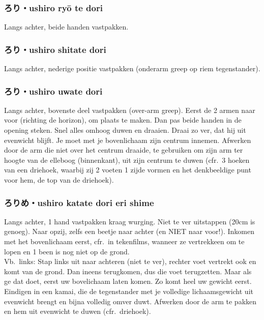 \subsubsection{ろり・ushiro ry\={o} te dori}
Langs achter, beide handen vastpakken.

\subsubsection{ろり・ushiro shitate dori}
Langs achter, nederige positie vastpakken (onderarm greep op riem tegenstander).

\subsubsection{ろり・ushiro uwate dori}
Langs achter, bovenste deel vastpakken (over-arm greep). Eerst de 2 armen naar voor (richting de horizon), om plaats te maken. Dan pas beide handen in de opening steken. Snel alles omhoog duwen en draaien. Draai zo ver, dat hij uit evenwicht blijft. Je moet met je bovenlichaam zijn centrum innemen. Afwerken door de arm die niet over het centrum draaide, te gebruiken om zijn arm ter hoogte van de elleboog (binnenkant), uit zijn centrum te duwen (cfr.\ 3 hoeken van een driehoek, waarbij zij 2 voeten 1 zijde vormen en het denkbeeldige punt voor hem, de top van de driehoek).

\subsubsection{ろりめ・ushiro katate dori eri shime}
Langs achter, 1 hand vastpakken kraag wurging. Niet te ver uitstappen (20cm is genoeg). Naar opzij, zelfs een beetje naar achter (en NIET naar voor!). Inkomen met het bovenlichaam eerst, cfr.\ in tekenfilms, wanneer ze vertrekkeen om te lopen en 1 been is nog niet op de grond.\\
Vb.\ links: Stap links uit naar achteren (niet te ver), rechter voet vertrekt ook en komt van de grond. Dan ineens terugkomen, dus die voet terugzetten. Maar als ge dat doet, eerst uw bovelichaam laten komen. Zo komt heel uw gewicht eerst. Eindigen in een kamai, die de tegenstander met je volledige lichaamsgewicht uit evenwicht brengt en bijna volledig omver duwt. Afwerken door de arm te pakken en hem uit evenwicht te duwen (cfr.\ driehoek).

